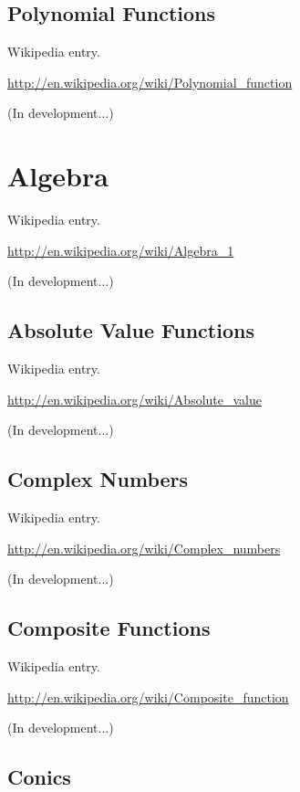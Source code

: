 \documentclass[12pt,twoside]{book}
\begin{document}
\subsection[Polynomial Functions]{Polynomial Functions}

Wikipedia entry.

\href{http://en.wikipedia.org/wiki/Polynomial_function}{http://en.wikipedia.org/wiki/Polynomial\_function}

(In development...)

\section[Algebra]{Algebra}

Wikipedia entry.

\href{http://en.wikipedia.org/wiki/Algebra_1}{http://en.wikipedia.org/wiki/Algebra\_1}

(In development...)

\subsection[Absolute Value Functions]{Absolute Value Functions}

Wikipedia entry.

\href{http://en.wikipedia.org/wiki/Absolute_value}{http://en.wikipedia.org/wiki/Absolute\_value}

(In development...)

\subsection[Complex Numbers]{Complex Numbers}

Wikipedia entry.

\href{http://en.wikipedia.org/wiki/Complex_numbers}{http://en.wikipedia.org/wiki/Complex\_numbers}

(In development...)

\subsection[Composite Functions]{Composite Functions}

Wikipedia entry.

\href{http://en.wikipedia.org/wiki/Composite_function}{http://en.wikipedia.org/wiki/Composite\_function}

(In development...)

\subsection[Conics]{Conics}
\end{document}
